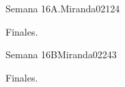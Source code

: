 \begin{syllabus}
\begin{unit}{Semana 16A.}{Miranda02}{12}{4}
   \begin{topics}
      \item Finales.
   \end{topics}
   \begin{learningoutcomes}
      \item 
   \end{learningoutcomes}
\end{unit}

\begin{unit}{Semana 16B}{Miranda02}{24}{3}
   \begin{topics}
      \item Finales.
   \end{topics}

   \begin{learningoutcomes}
      \item 
      \item
      \item 
      \end{learningoutcomes}
\end{unit}


\begin{coursebibliography}
\end{coursebibliography}

\end{syllabus}
